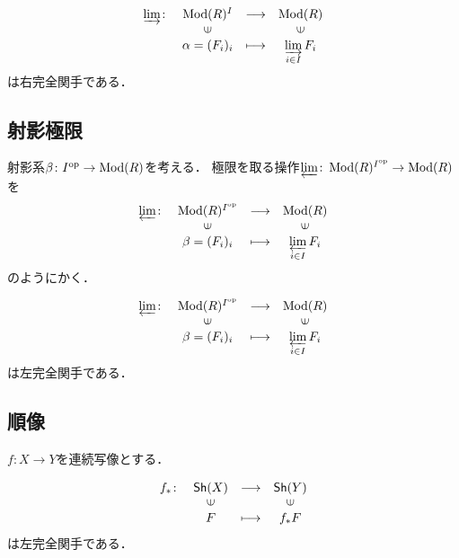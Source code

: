 \begin{PRP}
    \begin{equation*}
        \begin{array}{rccc}
            \varinjlim\colon&\Mod(R)^I&\longrightarrow&\Mod(R)\\
                &\rotatebox{90}{$\in$}&&\rotatebox{90}{$\in$}\\
                &\alpha=(F_i)_i &\longmapsto&\varinjlim\limits_{i\in I}F_i
        \end{array}
    \end{equation*}
    は右完全関手である．        
\end{PRP}

\subsection{射影極限}
射影系$\beta\colon I^{\rm op}\to \mathop{\mathrm{Mod}}\nolimits(R)$を考える．
極限を取る操作$\varprojlim\colon\mathop{\mathrm{Mod}}\nolimits(R)^{I^{\rm op}}\to\mathop{\mathrm{Mod}}\nolimits(R)$を
\begin{equation*}
    \begin{array}{rccc}
        \varprojlim\colon&\Mod(R)^{I^\op}&\longrightarrow&\Mod(R)\\
            &\rotatebox{90}{$\in$}&&\rotatebox{90}{$\in$}\\
            &\beta=(F_i)_i &\longmapsto&\varprojlim\limits_{i\in I}F_i
    \end{array}
\end{equation*}
のようにかく．

\begin{PRP}
    \begin{equation*}
        \begin{array}{rccc}
            \varprojlim\colon&\Mod(R)^{I^\op}&\longrightarrow&\Mod(R)\\
                &\rotatebox{90}{$\in$}&&\rotatebox{90}{$\in$}\\
                &\beta=(F_i)_i &\longmapsto&\varprojlim\limits_{i\in I}F_i
        \end{array}
    \end{equation*}
    は左完全関手である．        
\end{PRP}

\subsection{順像}
\(f\colon X\to Y\)を連続写像とする．


\begin{PRP}
    \[
        \begin{array}{rccc}
            f_\ast\colon&   \Sh(X)& \longrightarrow& \Sh(Y) \\
            &   \rotatebox{90}{$\in$}&&\rotatebox{90}{$\in$}\\
            &   F&  \longmapsto&    f_\ast F   
        \end{array}
    \]
    は左完全関手である．
\end{PRP}


